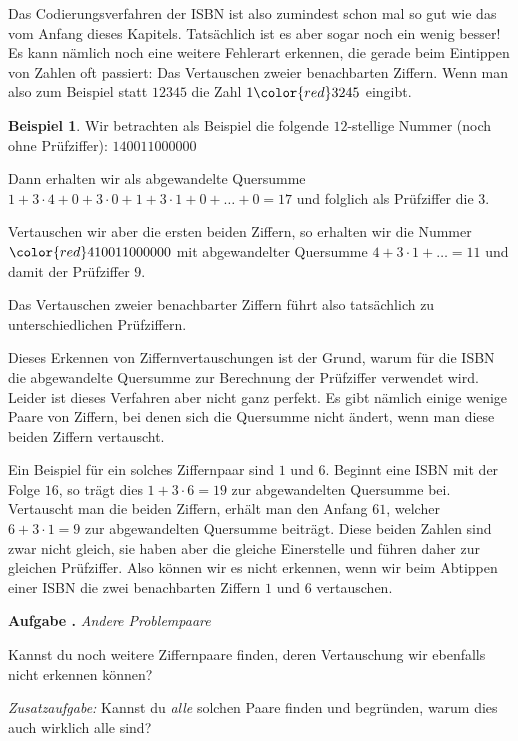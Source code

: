 \documentclass[a4paper,ngerman,12pt]{scrartcl}
\newcommand{\red}[1]{{\color{red}#1}}
\theoremstyle{definition}
\newtheorem{bsp}[defn]{Beispiel}
\theoremstyle{plain}
\theoremstyle{remark}
\newlength{\aufgabenskip}
\newcounter{aufgabennummer}
\newenvironment{aufgabe}[1]{
	\addtocounter{aufgabennummer}{1}
	\textbf{Aufgabe \theaufgabennummer.} \emph{#1} \par
}{\vspace{\aufgabenskip}}
\begin{document}
Das Codierungsverfahren der ISBN ist also zumindest schon mal so gut wie das vom Anfang dieses Kapitels. Tatsächlich ist es aber sogar noch ein wenig besser! Es kann nämlich noch eine weitere Fehlerart erkennen, die gerade beim Eintippen von Zahlen oft passiert: Das Vertauschen zweier benachbarten Ziffern. Wenn man also zum Beispiel statt $12345$ die Zahl $1\red{32}45$ eingibt.

\begin{bsp}
	Wir betrachten als Beispiel die folgende $12$-stellige Nummer (noch ohne Prüfziffer): $140011000000$
	
	Dann erhalten wir als abgewandelte Quersumme $1+3\cdot 4+0+3\cdot 0+1+3\cdot 1+ 0+\dots +0=17$ und folglich als Prüfziffer die $3$.
	
	Vertauschen wir aber die ersten beiden Ziffern, so erhalten wir die Nummer $\red{41}0011000000$ mit abgewandelter Quersumme $4+3\cdot 1 + \dots = 11$ und damit der Prüfziffer $9$.
	
	Das Vertauschen zweier benachbarter Ziffern führt also tatsächlich zu unterschiedlichen Prüfziffern.
\end{bsp}

Dieses Erkennen von Ziffernvertauschungen ist der Grund, warum für die ISBN die abgewandelte Quersumme zur Berechnung der Prüfziffer verwendet wird. Leider ist dieses Verfahren aber nicht ganz perfekt. Es gibt nämlich einige wenige Paare von Ziffern, bei denen sich die Quersumme nicht ändert, wenn man diese beiden Ziffern vertauscht. 

Ein Beispiel für ein solches Ziffernpaar sind $1$ und $6$. Beginnt eine ISBN mit der Folge $16$, so trägt dies $1+3\cdot 6=19$  zur abgewandelten Quersumme bei. Vertauscht man die beiden Ziffern, erhält man den Anfang $61$, welcher $6+3\cdot 1=9$ zur abgewandelten Quersumme beiträgt. Diese beiden Zahlen sind zwar nicht gleich, sie haben aber die gleiche Einerstelle und führen daher zur gleichen Prüfziffer. Also können wir es nicht erkennen, wenn wir beim Abtippen einer ISBN die zwei benachbarten Ziffern $1$ und $6$ vertauschen.

\begin{aufgabe}{Andere Problempaare}
	Kannst du noch weitere Ziffernpaare finden, deren Vertauschung wir ebenfalls nicht erkennen können?
	
	\emph{Zusatzaufgabe:} Kannst du \emph{alle} solchen Paare finden und begründen, warum dies auch wirklich alle sind?
\end{aufgabe}


\end{document}
